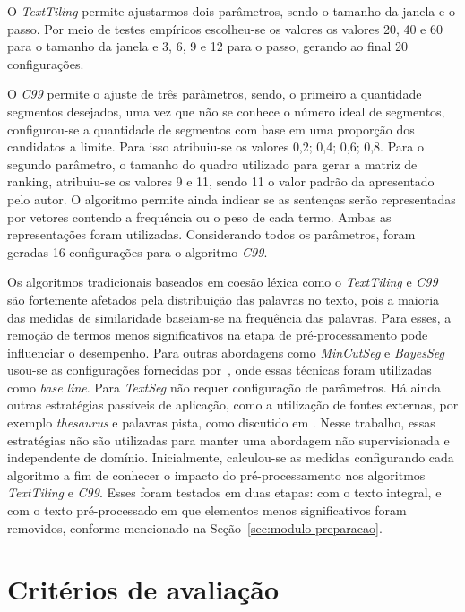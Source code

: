   

O \textit{TextTiling} permite ajustarmos dois parâmetros, sendo o tamanho da janela e o passo. Por meio de testes empíricos escolheu-se os valores os valores 20, 40 e 60 para o tamanho da janela e 3, 6, 9 e 12 para o passo, gerando ao final 20 configurações.
%

O \textit{C99} permite o ajuste de três parâmetros, sendo, o primeiro a quantidade segmentos desejados, uma vez que não se conhece o número ideal de segmentos, configurou-se a quantidade de segmentos com base em uma proporção dos candidatos a limite. Para isso atribuiu-se os valores {0,2; 0,4; 0,6; 0,8}. Para o segundo parâmetro, o tamanho do quadro utilizado para gerar a matriz de ranking, atribuiu-se os valores 9 e 11, sendo 11 o valor padrão da apresentado pelo autor. O algoritmo permite ainda indicar se as sentenças serão representadas por vetores contendo a frequência ou o peso de cada termo. Ambas as representações foram utilizadas. Considerando todos os parâmetros, foram geradas 16 configurações para o algoritmo \textit{C99}.

Os algoritmos tradicionais baseados em coesão léxica como o \textit{TextTiling} e \textit{C99} são fortemente afetados pela distribuição das palavras no texto, pois a maioria das medidas de similaridade baseiam-se na frequência das palavras. Para esses, a remoção de termos menos significativos na etapa de pré-processamento pode influenciar o desempenho. Para outras abordagens como \textit{MinCutSeg} e \textit{BayesSeg} usou-se as configurações fornecidas por~\cite{Eis2008}, onde essas técnicas foram utilizadas como \textit{base line}. Para \textit{TextSeg} não requer configuração de parâmetros.
Há ainda outras estratégias passíveis de aplicação, como a utilização de fontes externas, por exemplo \textit{thesaurus} e palavras pista, como discutido em \cite{Naili2016, Gutierrez2016, Ferret2009}. Nesse trabalho, essas estratégias não são utilizadas para manter uma abordagem não supervisionada e independente de domínio. 
Inicialmente, calculou-se as medidas configurando cada algoritmo
a fim de conhecer o impacto do pré-processamento nos algoritmos \textit{TextTiling} e \textit{C99}. Esses foram testados em duas etapas: com o texto integral, e com o texto pré-processado em que elementos menos significativos foram removidos, conforme mencionado na Seção~\ref{sec:modulo-preparacao}.  

\section{Critérios de avaliação}

